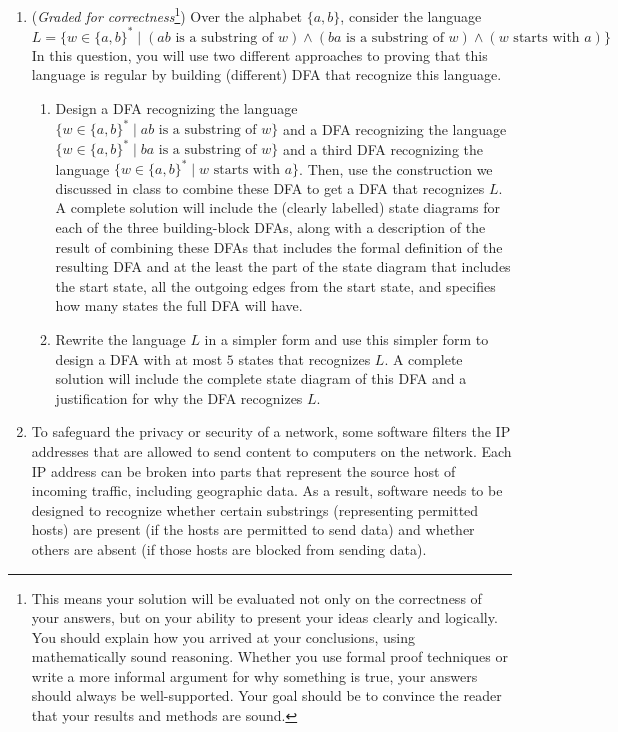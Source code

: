 \begin{enumerate}
\item ({\it Graded for correctness}\footnote{This means your solution will be
evaluated not only on the correctness of your answers, but on your ability to 
present your ideas clearly and logically. You should explain how you arrived at 
your conclusions, using 
mathematically sound reasoning. Whether you use formal proof techniques or 
write a more informal argument for why 
something is true, your answers should always be well-supported. Your goal 
should be to convince the reader that 
your results and methods are sound.}) Over the alphabet $\{a,b\}$, consider the language
\[
    L = \{ w \in \{a,b\}^* \mid (ab \textrm{ is a substring of $w$}) \land (ba \textrm{ is a substring of $w$})
    \land (w \textrm{ starts with } a)\}
\]
In this question, you will use two different approaches to proving that this language is 
regular by building (different) DFA that recognize this language.
\begin{enumerate}
    \item Design a DFA recognizing the language $\{ w \in \{a,b\}^* \mid ab \textrm{ is a substring of $w$}\}$
    and a DFA recognizing the language $\{ w \in \{a,b\}^* \mid ba \textrm{ is a substring of $w$}\}$
    and a third DFA recognizing the language $\{ w \in \{a,b\}^* \mid w \textrm{ starts with } a\}$. Then, 
    use the construction we discussed in class to combine these DFA to get a DFA that recognizes
    $L$. A complete solution will include the (clearly labelled) state diagrams for each 
    of the three building-block DFAs, along with a description of the result of combining these DFAs that includes
    the formal definition of the resulting DFA and 
    at the least the part of the state diagram that includes the start state, all the outgoing edges
    from the start state, and specifies
    how many states the full DFA will have.
    \item Rewrite the language $L$ in a simpler form and use this simpler form to design a DFA with at most
    $5$ states that recognizes $L$. A complete solution will include the complete state diagram 
    of this DFA and a justification for why the DFA recognizes $L$.
\end{enumerate}

\item  To safeguard the privacy or security of a network, some software filters
the IP addresses that are allowed to send content to computers on the network. Each IP address
can be broken into parts that represent the source host of incoming traffic, including geographic data.
As a result, software needs to be designed to recognize whether certain substrings (representing
permitted hosts) are present (if the hosts are permitted to send data) and whether others
are absent (if those hosts are blocked from sending data).


\end{enumerate}
